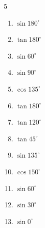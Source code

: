\begin{multicols}{5}
\begin{enumerate}
\resetques

  \item $\displaystyle \sin{180^\circ}$

        \phantom{$\displaystyle =0$}

  \item $\displaystyle \tan{180^\circ}$

        \phantom{$\displaystyle =0$}

  \item $\displaystyle \sin{60^\circ}$


  \item $\displaystyle \sin{90^\circ}$

        \phantom{$\displaystyle =1$}

  \item $\displaystyle \cos{135^\circ}$


  \item $\displaystyle \tan{180^\circ}$

        \phantom{$\displaystyle =0$}

  \item $\displaystyle \tan{120^\circ}$


  \item $\displaystyle \tan{45^\circ}$

        \phantom{$\displaystyle =1$}

  \item $\displaystyle \sin{135^\circ}$


  \item $\displaystyle \cos{150^\circ}$


  \item $\displaystyle \sin{60^\circ}$


  \item $\displaystyle \sin{30^\circ}$


  \item $\displaystyle \sin{0^\circ}$


\end{enumerate}
\end{multicols}

